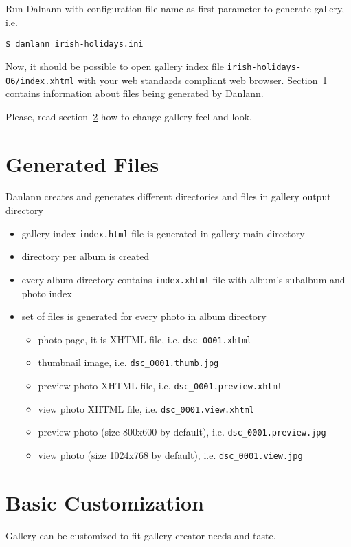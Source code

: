 \documentclass{article}
\begin{document}
Run Dalnann with configuration file name as first parameter to generate
gallery, i.e.
\begin{verbatim}
$ danlann irish-holidays.ini
\end{verbatim}
Now, it should be possible to open gallery index file
\verb$irish-holidays-06/index.xhtml$ with your web standards compliant web
browser. Section~\ref{generated} contains information about files being 
generated by Danlann.

Please, read section~\ref{customization} how to change gallery feel and look.

\section{Generated Files}\label{generated}
Danlann creates and generates different directories and files
in gallery output directory
\begin{itemize}
\item gallery index \texttt{index.html} file is generated in gallery main
    directory
\item directory per album is created
\item every album directory contains \texttt{index.xhtml} file
    with album's subalbum and photo index
\item set of files is generated for every photo in album directory
    \begin{itemize}
    \item photo page, it is XHTML file, i.e. \texttt{dsc\_0001.xhtml}
    \item thumbnail image, i.e. \texttt{dsc\_0001.thumb.jpg}
    \item preview photo XHTML file, i.e. \texttt{dsc\_0001.preview.xhtml}
    \item view photo XHTML file, i.e. \texttt{dsc\_0001.view.xhtml}
    \item preview photo (size 800x600 by default),
        i.e. \texttt{dsc\_0001.preview.jpg}
    \item view photo (size 1024x768 by default),
        i.e. \texttt{dsc\_0001.view.jpg}
    \end{itemize}
\end{itemize}

\section{Basic Customization}\label{customization}
Gallery can be customized to fit gallery creator needs and taste.
\end{document}
